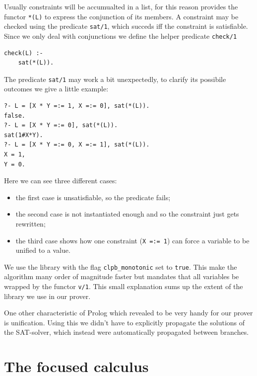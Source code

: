 \documentclass[a4paper, 12pt, english]{report}
\begin{document}
Usually constraints will be accumualted in a list, for this reason \CLPB provides the functor \texttt{*(L)} to express the conjunction of its members.
A constraint may be checked using the predicate \texttt{sat/1}, which succeds iff the constraint is satisfiable.
Since we only deal with conjunctions we define the helper predicate \texttt{check/1}
\begin{verbatim}
check(L) :-
	sat(*(L)).
\end{verbatim}
The predicate \texttt{sat/1} may work a bit unexpectedly, to clarify its possibile outcomes we give a little example:
\begin{verbatim}
?- L = [X * Y =:= 1, X =:= 0], sat(*(L)).
false.
?- L = [X * Y =:= 0], sat(*(L)).
sat(1#X*Y).
?- L = [X * Y =:= 0, X =:= 1], sat(*(L)).
X = 1,
Y = 0.
\end{verbatim}
Here we can see three different cases:
\begin{itemize}
	\item the first case is unsatisfiable, so the predicate fails;
	\item the second case is not instantiated enough and so the constraint just gets rewritten;
	\item the third case shows how one constraint (\texttt{X =:= 1}) can force a variable to be unified to a value.
\end{itemize}
We use the library with the flag \texttt{clpb\_monotonic} set to \texttt{true}.
This make the algorithm many order of magnitude faster but mandates that all variables be wrapped by the functor \texttt{v/1}.
This small explanation sums up the extent of the library we use in our prover.

One other characteristic of Prolog which revealed to be very handy for our prover is unification.
Using this we didn't have to explicitly propagate the solutions of the SAT-solver, which instead were automatically propagated between branches.

\chapter{The focused calculus}

\end{document}
